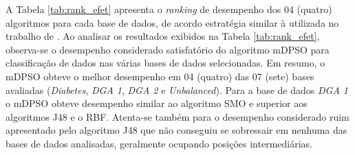 \documentclass[
	12pt,				%
	openany,			%
	oneside,	
	a4paper,			%
	brazil,				%
	]{unimontes-ppgmsc-abntex2}
\begin{document}
\begin{table}[!ht]
\setlength{\arrayrulewidth}{.2em}
\vspace{12pt}
\centering{}
\caption{Desempenho de cada algoritmo segundo o produto da sensibilidade pela especificidade global para cada base de dados.}
\label{tab:sen_esp_global}
\end{table}

A Tabela \ref{tab:rank_efet} apresenta o {\em ranking} de desempenho dos 04 (quatro) algoritmos para cada base de dados, de acordo estratégia similar à utilizada no trabalho de . Ao analisar os resultados exibidos na Tabela \ref{tab:rank_efet}, observa-se o desempenho considerado satisfatório do algoritmo mDPSO para classificação de dados nas várias bases de dados selecionadas. Em resumo, o mDPSO obteve o melhor desempenho em 04 (quatro) das 07 (sete) bases avaliadas ({\em Diabetes}, {\em DGA 1}, {\em DGA 2} e {\em Unbalanced}). Para a base de dados {\em DGA 1} o mDPSO obteve desempenho similar ao algoritmo SMO e superior aos algoritmos J48 e o RBF. Atenta-se também para o desempenho considerado ruim apresentado pelo algoritmo J48 que não conseguiu se sobressair em nenhuma das bases de dados analisadas, geralmente ocupando posições intermediárias. 
\end{document}
